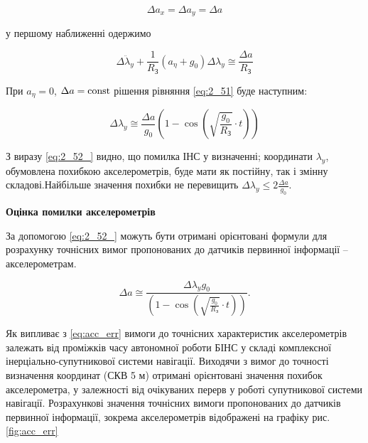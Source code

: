 \[\Delta a_{x} =\Delta a_{y} =\Delta a\] 

у першому наближенні одержимо

\begin{equation} 
\label{eq:2_51} 
\Delta \ddot{\lambda }_{y} +\frac{1}{R_{{\text{З}}} } (a_{\eta } +g_{0} )\Delta \lambda _{y} \cong \frac{\Delta a}{R_{{\text{З}}} }  
\end{equation} 

При $a_{\eta } =0$, $\Delta a={\rm const}$ рішення рівняння \eqref{eq:2_51} буде наступним:

\begin{equation} 
\label{eq:2_52_} 
\Delta \lambda _{y} \cong \frac{\Delta a}{g_{0} } \left(1-\cos \left(\sqrt{\frac{g_{0} }{R_{{\text{З}}} } } \cdot t\right)\right) 
\end{equation} 

З виразу \eqref{eq:2_52_} видно, що помилка ІНС у визначенні; координати $\lambda _{y} $, обумовлена похибкою акселерометрів, 
буде мати як постійну, так і змінну складові.Найбільше значення похибки не перевищить  $\Delta \lambda _{y} \le 2\frac{\Delta a}{g_{0} } $. 




\textbf{Оцінка помилки акселерометрів}

За допомогою \eqref{eq:2_52_} можуть бути отримані орієнтовані формули для розрахунку точнісних вимог пропонованих до датчиків первинної 
інформації -- акселерометрам.

\begin{equation} 
\label{eq:acc_err} 
\Delta a\cong \frac{\Delta \lambda _{y} g_{0} }{\left(1-\cos \left(\sqrt{\frac{g_{0} }{R_{{\text{З}}} } } \cdot t\right)\right)}.    
\end{equation} 

Як випливає з \eqref{eq:acc_err} вимоги до точнісних характеристик акселерометрів залежать від проміжків часу 
автономної роботи БІНС у складі комплексної інерціально-супутникової системи навігації. Виходячи з вимог до 
точності визначення координат (СКВ  5 м) отримані орієнтовані значення похибок акселерометра, у залежності 
від очікуваних перерв у роботі супутникової системи навігації. Розрахункові значення точнісних вимоги 
пропонованих до датчиків первинної інформації, зокрема акселерометрів відображені на графіку рис. \ref{fig:acc_err} 

